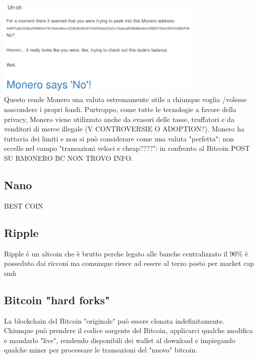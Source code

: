 \documentclass {article}
\begin{document}
\vspace {0.5cm}
\includegraphics [width = 10cm] {media/monero.png}
\vspace {0.5cm}
\\
Questo rende Monero una valuta estremamente utile a chiunque voglia /volesse nascondere i propri fondi.
Purtroppo, come tutte le tecnologie a favore della privacy, Monero viene utilizzato anche da evasori delle tasse, truffatori e da venditori di merce illegale (V CONTROVERSIE O ADOPTION?).
Monero ha tuttavia dei limiti e non si può considerare come una valuta "perfetta": non eccelle nel campo "transazioni veloci e cheap????": in confronto al Bitcoin POST SU RMONERO BC NON TROVO INFO.


\subsection {Nano}


BEST COIN


\subsection {Ripple}


Ripple è un altcoin che è brutto perche legato alle banche centralizzato il 90\% è posseduto dai ricconi ma comunque riesce ad essere al terzo posto per market cap smh


\subsection {Bitcoin "hard forks"}


La blockchain del Bitcoin "originale" può essere clonata indefinitamente. Chiunque può prendere il codice sorgente del Bitcoin, applicarci qualche modifica e mandarlo "live", rendendo disponibili dei wallet al download e impiegando qualche miner per processare le transazioni del "nuovo" bitcoin.
\end{document}
